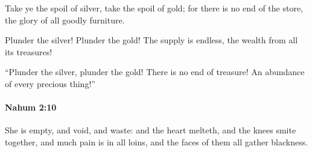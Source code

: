 			\begin{versebox}
					\item[BHS] 
					\item[LXX] 
					\item[ASV] Take ye the spoil of silver, take the spoil of gold; for there is no end of the store, the glory of all goodly furniture.
					\item[NIV] Plunder the silver! Plunder the gold! The supply is endless, the wealth from all its treasures!
					\item[NRSV] “Plunder the silver, plunder the gold! There is no end of treasure! An abundance of every precious thing!”
			\end{versebox}

		\paragraph{Nahum 2:10} %
			\label{NAHUM-2-10}

			She is empty, and void, and waste: and the heart melteth, and the knees smite together, and much pain is in all loins, and the faces of them all gather blackness.

